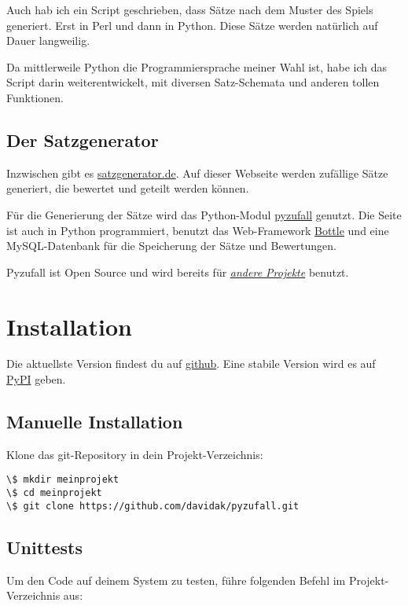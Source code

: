 \documentclass[a4paper,12pt,oneside]{sphinxmanual}
\begin{document}
Auch hab ich ein Script geschrieben, dass Sätze nach dem Muster des Spiels generiert. Erst in Perl und dann in Python. Diese Sätze werden natürlich auf Dauer langweilig.

Da mittlerweile Python die Programmiersprache meiner Wahl ist, habe ich das Script darin weiterentwickelt, mit diversen Satz-Schemata und anderen tollen Funktionen.


\section{Der Satzgenerator}
\label{entstehung:der-satzgenerator}
Inzwischen gibt es \href{http://satzgenerator.de/}{satzgenerator.de}. Auf dieser Webseite werden zufällige Sätze generiert, die bewertet und geteilt werden können.

Für die Generierung der Sätze wird das Python-Modul \href{https://github.com/davidak/pyzufall}{pyzufall} genutzt. Die Seite ist auch in Python programmiert, benutzt das Web-Framework \href{http://bottlepy.org/}{Bottle} und eine MySQL-Datenbank für die Speicherung der Sätze und Bewertungen.

Pyzufall ist Open Source und wird bereits für {\hyperref[benutzer::doc]{\emph{andere Projekte}}} benutzt.


\chapter{Installation}
\label{installation:installation}\label{installation::doc}
Die aktuellste Version findest du auf \href{https://github.com/davidak/pyzufall}{github}. Eine stabile Version wird es auf \href{https://pypi.python.org/}{PyPI} geben.


\section{Manuelle Installation}
\label{installation:manuelle-installation}
Klone das git-Repository in dein Projekt-Verzeichnis:

\begin{Verbatim}[commandchars=\\\{\}]
\$ mkdir meinprojekt
\$ cd meinprojekt
\$ git clone https://github.com/davidak/pyzufall.git
\end{Verbatim}


\section{Unittests}
\label{installation:unittests}
Um den Code auf deinem System zu testen, führe folgenden Befehl im Projekt-Verzeichnis aus:
\end{document}

